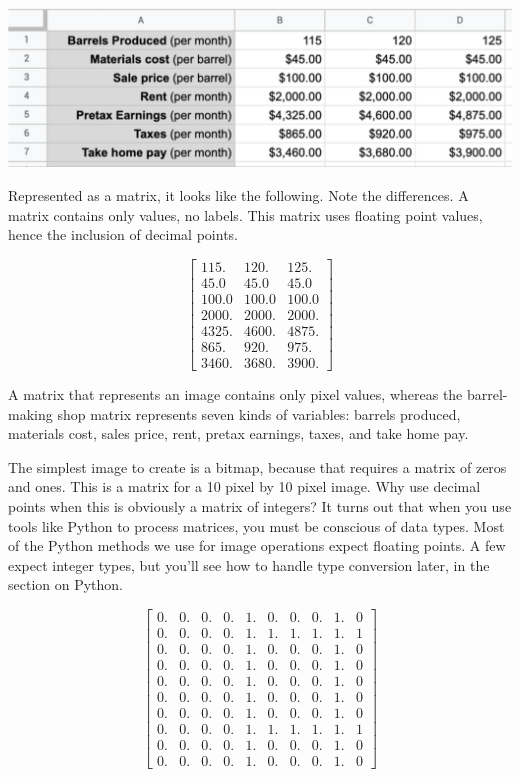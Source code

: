 \includegraphics[width=1.0\textwidth]{spreadsheet.png}

Represented as a matrix, it looks like the following. Note the differences. A 
matrix contains only values, no labels. This matrix uses floating point values, 
hence the inclusion of decimal points. 

$$\begin{bmatrix}
115. & 120. & 125.\\
45.0 & 45.0 & 45.0\\
100.0 & 100.0 & 100.0\\
2000. & 2000. & 2000.\\
4325. & 4600. & 4875.\\
865. & 920. & 975.\\
3460. & 3680. & 3900.
\end{bmatrix}$$
 
A matrix that represents an image contains only pixel values, whereas the 
barrel-making shop matrix represents seven kinds of variables: barrels 
produced, materials cost, sales price, rent, pretax earnings, taxes, and take 
home pay. 

The simplest image to create is a bitmap, because that requires a matrix of 
zeros and ones. This is a matrix for a 10 pixel by 10 pixel image. Why use 
decimal points when this is obviously a matrix of integers? It turns out that 
when you use tools like Python to process matrices, you must be conscious of 
data types. Most of the Python methods we use for image operations expect 
floating points. A few expect integer types, but you'll see how to handle type 
conversion later, in the section on Python. 

$$\begin{bmatrix}
0. & 0. & 0. & 0. & 1. & 0. & 0. & 0. & 1. & 0\\
0. & 0. & 0. & 0. & 1. & 1. & 1. & 1. & 1. & 1\\
0. & 0. & 0. & 0. & 1. & 0. & 0. & 0. & 1. & 0\\
0. & 0. & 0. & 0. & 1. & 0. & 0. & 0. & 1. & 0\\
0. & 0. & 0. & 0. & 1. & 0. & 0. & 0. & 1. & 0\\
0. & 0. & 0. & 0. & 1. & 0. & 0. & 0. & 1. & 0\\
0. & 0. & 0. & 0. & 1. & 0. & 0. & 0. & 1. & 0\\
0. & 0. & 0. & 0. & 1. & 1. & 1. & 1. & 1. & 1\\
0. & 0. & 0. & 0. & 1. & 0. & 0. & 0. & 1. & 0\\
0. & 0. & 0. & 0. & 1. & 0. & 0. & 0. & 1. & 0
\end{bmatrix}$$

